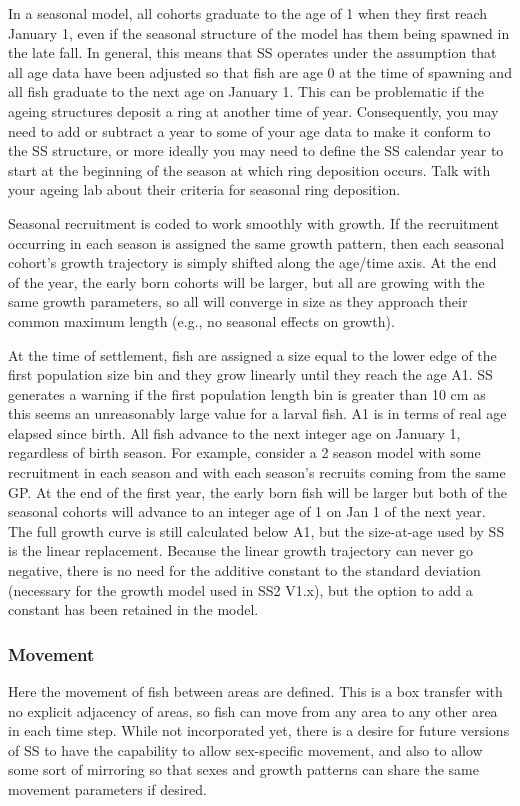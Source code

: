 In a seasonal model, all cohorts graduate to the age of 1 when they first reach January 1, even if the seasonal structure of the model has them being spawned in the late fall. In general, this means that SS operates under the assumption that all age data have been adjusted so that fish are age 0 at the time of spawning and all fish graduate to the next age on January 1. This can be problematic if the ageing structures deposit a ring at another time of year. Consequently, you may need to add or subtract a year to some of your age data to make it conform to the SS structure, or more ideally you may need to define the SS calendar year to start at the beginning of the season at which ring deposition occurs. Talk with your ageing lab about their criteria for seasonal ring deposition.
		
Seasonal recruitment is coded to work smoothly with growth. If the recruitment occurring in each season is assigned the same growth pattern, then each seasonal cohort’s growth trajectory is simply shifted along the age/time axis. At the end of the year, the early born cohorts will be larger, but all are growing with the same growth parameters, so all will converge in size as they approach their common maximum length (e.g., no seasonal effects on growth).
	
At the time of settlement, fish are assigned a size equal to the lower edge of the first population size bin and they grow linearly until they reach the age A1. SS generates a warning if the first population length bin is greater than 10 cm as this seems an unreasonably large value for a larval fish.  A1 is in terms of real age elapsed since birth. All fish advance to the next integer age on January 1, regardless of birth season. For example, consider a 2 season model with some recruitment in each season and with each season's recruits coming from the same GP.  At the end of the first year, the early born fish will be larger but both of the seasonal cohorts will advance to an integer age of 1 on Jan 1 of the next year.  The full growth curve is still calculated below A1, but the size-at-age used by SS is the linear replacement. Because the linear growth trajectory can never go negative, there is no need for the additive constant to the standard deviation (necessary for the growth model used in SS2 V1.x), but the option to add a constant has been retained in the model.

\subsubsection{Movement}
Here the movement of fish between areas are defined.  This is a box transfer with no explicit adjacency of areas, so fish can move from any area to any other area in each time step. While not incorporated yet, there is a desire for future versions of SS to have the capability to allow sex-specific movement, and also to allow some sort of mirroring so that sexes and growth patterns can share the same movement parameters if desired.

